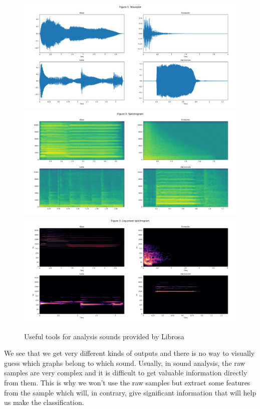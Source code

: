 \documentclass{article} %
\begin{document}
		\begin{figure}
		  \includegraphics[width=\linewidth]{waveplot.png}
		  \includegraphics[width=\linewidth]{spectrogram.png}
		  \includegraphics[width=\linewidth]{logspectrogram.png}
		  \caption{Useful tools for analysis sounds provided by Librosa}
		  \label{fig:graphs}
		\end{figure}

		We see that we get very different kinds of outputs and there is no way to visually guess which graphs belong to which sound.
		Usually, in sound analysis, the raw samples are very complex and it is difficult to get valuable information directly from them.
		This is why we won't use the raw samples but extract some features from the sample which will, in contrary, give significant information that will help us make the classification.
\end{document}
